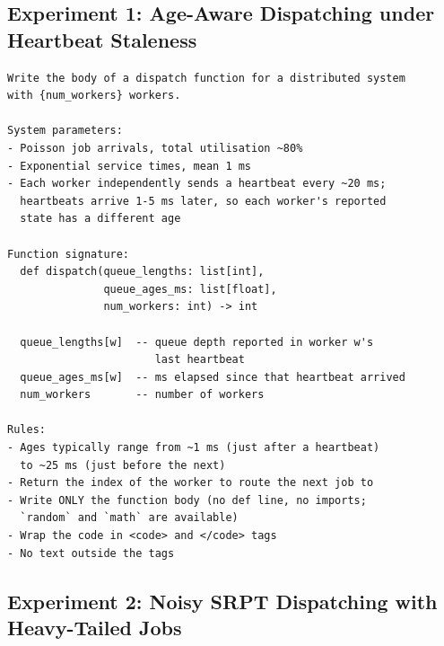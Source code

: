 \documentclass[11pt]{article}
\begin{document}
\subsection{Experiment 1: Age-Aware Dispatching under Heartbeat Staleness}

\begin{lstlisting}
Write the body of a dispatch function for a distributed system
with {num_workers} workers.

System parameters:
- Poisson job arrivals, total utilisation ~80%
- Exponential service times, mean 1 ms
- Each worker independently sends a heartbeat every ~20 ms;
  heartbeats arrive 1-5 ms later, so each worker's reported
  state has a different age

Function signature:
  def dispatch(queue_lengths: list[int],
               queue_ages_ms: list[float],
               num_workers: int) -> int

  queue_lengths[w]  -- queue depth reported in worker w's
                       last heartbeat
  queue_ages_ms[w]  -- ms elapsed since that heartbeat arrived
  num_workers       -- number of workers

Rules:
- Ages typically range from ~1 ms (just after a heartbeat)
  to ~25 ms (just before the next)
- Return the index of the worker to route the next job to
- Write ONLY the function body (no def line, no imports;
  `random` and `math` are available)
- Wrap the code in <code> and </code> tags
- No text outside the tags
\end{lstlisting}

\subsection{Experiment 2: Noisy SRPT Dispatching with Heavy-Tailed Jobs}
\end{document}
